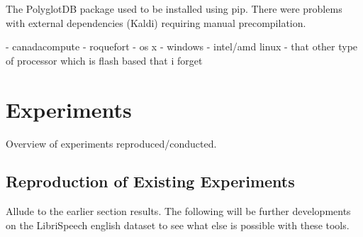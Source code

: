 \documentclass[11pt]{article}
\begin{document}
The PolyglotDB package used to be installed using pip. There were problems with external dependencies (Kaldi) requiring manual precompilation.

- canadacompute
- roquefort
- os x
- windows
- intel/amd linux
- that other type of processor which is flash based that i forget

\section{Experiments}

Overview of experiments reproduced/conducted.

\subsection{Reproduction of Existing Experiments}

Allude to the earlier section results. The following will be further developments on the LibriSpeech english dataset to see what else is possible with these tools.
\end{document}
